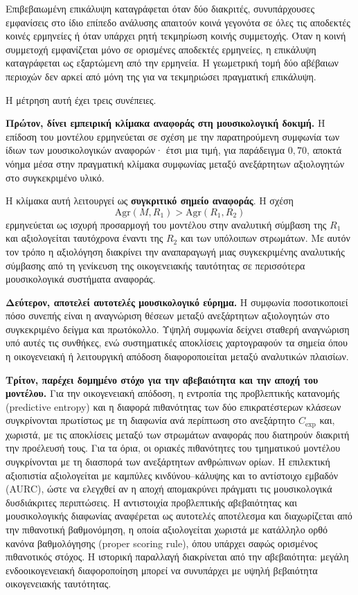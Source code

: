 \documentclass[11pt,a4paper]{article}
\begin{document}
Επιβεβαιωμένη επικάλυψη καταγράφεται όταν δύο διακριτές, συνυπάρχουσες εμφανίσεις στο ίδιο επίπεδο ανάλυσης απαιτούν κοινά γεγονότα σε όλες τις αποδεκτές κοινές ερμηνείες ή όταν υπάρχει ρητή τεκμηρίωση κοινής συμμετοχής. Όταν η κοινή συμμετοχή εμφανίζεται μόνο σε ορισμένες αποδεκτές ερμηνείες, η επικάλυψη καταγράφεται ως εξαρτώμενη από την ερμηνεία. Η γεωμετρική τομή δύο αβέβαιων περιοχών δεν αρκεί από μόνη της για να τεκμηριώσει πραγματική επικάλυψη.

Η μέτρηση αυτή έχει τρεις συνέπειες.

\textbf{Πρώτον, δίνει εμπειρική κλίμακα αναφοράς στη μουσικολογική δοκιμή.} Η επίδοση του μοντέλου ερμηνεύεται σε σχέση με την παρατηρούμενη συμφωνία των ίδιων των μουσικολογικών αναφορών· έτσι μια τιμή, για παράδειγμα \(0{,}70\), αποκτά νόημα μέσα στην πραγματική κλίμακα συμφωνίας μεταξύ ανεξάρτητων αξιολογητών στο συγκεκριμένο υλικό.

Η κλίμακα αυτή λειτουργεί ως \textbf{συγκριτικό σημείο αναφοράς}. Η σχέση
\[
\mathrm{Agr}(M,R_1)>\mathrm{Agr}(R_1,R_2)
\]
ερμηνεύεται ως ισχυρή προσαρμογή του μοντέλου στην αναλυτική σύμβαση της \(R_1\) και αξιολογείται ταυτόχρονα έναντι της \(R_2\) και των υπόλοιπων στρωμάτων. Με αυτόν τον τρόπο η αξιολόγηση διακρίνει την αναπαραγωγή μιας συγκεκριμένης αναλυτικής σύμβασης από τη γενίκευση της οικογενειακής ταυτότητας σε περισσότερα μουσικολογικά συστήματα αναφοράς.

\textbf{Δεύτερον, αποτελεί αυτοτελές μουσικολογικό εύρημα.} Η συμφωνία ποσοτικοποιεί πόσο συνεπής είναι η αναγνώριση θέσεων μεταξύ ανεξάρτητων αξιολογητών στο συγκεκριμένο δείγμα και πρωτόκολλο. Υψηλή συμφωνία δείχνει σταθερή αναγνώριση υπό αυτές τις συνθήκες, ενώ συστηματικές αποκλίσεις χαρτογραφούν τα σημεία όπου η οικογενειακή ή λειτουργική απόδοση διαφοροποιείται μεταξύ αναλυτικών πλαισίων.

\textbf{Τρίτον, παρέχει δομημένο στόχο για την αβεβαιότητα και την αποχή του μοντέλου.} Για την οικογενειακή απόδοση, η εντροπία της προβλεπτικής κατανομής (predictive entropy) και η διαφορά πιθανότητας των δύο επικρατέστερων κλάσεων συγκρίνονται πρωτίστως με τη διαφωνία ανά περίπτωση στο ανεξάρτητο $C_{\mathrm{exp}}$ και, χωριστά, με τις αποκλίσεις μεταξύ των στρωμάτων αναφοράς που διατηρούν διακριτή την προέλευσή τους. Για τα όρια, οι οριακές πιθανότητες του τμηματικού μοντέλου συγκρίνονται με τη διασπορά των ανεξάρτητων ανθρώπινων ορίων. Η επιλεκτική αξιοπιστία αξιολογείται με καμπύλες κινδύνου--κάλυψης και το αντίστοιχο εμβαδόν (AURC), ώστε να ελεγχθεί αν η αποχή απομακρύνει πράγματι τις μουσικολογικά δυσδιάκριτες περιπτώσεις. Η αντιστοιχία προβλεπτικής αβεβαιότητας και μουσικολογικής διαφωνίας αναφέρεται ως αυτοτελές αποτέλεσμα και διαχωρίζεται από την πιθανοτική βαθμονόμηση, η οποία αξιολογείται χωριστά με κατάλληλο ορθό κανόνα βαθμολόγησης (proper scoring rule), όπου υπάρχει σαφώς ορισμένος πιθανοτικός στόχος. Η ιστορική παραλλαγή διακρίνεται από την αβεβαιότητα: μεγάλη ενδοοικογενειακή διαφοροποίηση μπορεί να συνυπάρχει με υψηλή βεβαιότητα οικογενειακής ταυτότητας.
\end{document}
